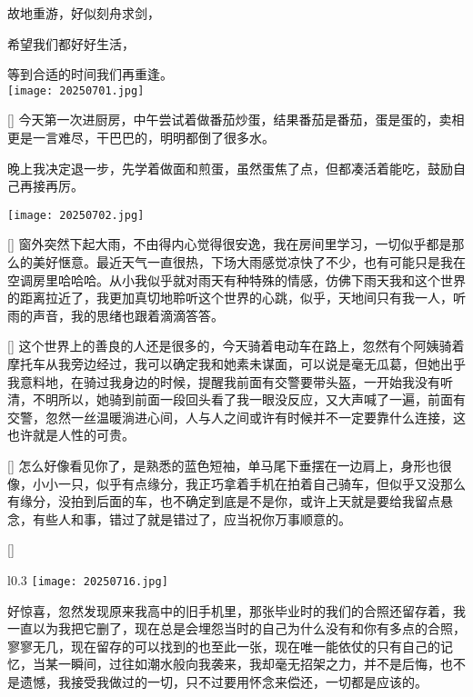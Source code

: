 \documentclass{diary}
\begin{document}
故地重游，好似刻舟求剑，

希望我们都好好生活，

等到合适的时间我们再重逢。\\

\texttt{[image: 20250701.jpg]} 

[\nerdSmile]%
今天第一次进厨房，中午尝试着做番茄炒蛋，结果番茄是番茄，蛋是蛋的，卖相更是一言难尽，干巴巴的，明明都倒了很多水。\par
晚上我决定退一步，先学着做面和煎蛋，虽然蛋焦了点，但都凑活着能吃，鼓励自己再接再厉。\\

\begin{center}
    \texttt{[image: 20250702.jpg]}
\end{center}

[\rainy]%
窗外突然下起大雨，不由得内心觉得很安逸，我在房间里学习，一切似乎都是那么的美好惬意。最近天气一直很热，下场大雨感觉凉快了不少，也有可能只是我在空调房里哈哈哈。从小我似乎就对雨天有种特殊的情感，仿佛下雨天我和这个世界的距离拉近了，我更加真切地聆听这个世界的心跳，似乎，天地间只有我一人，听雨的声音，我的思绪也跟着滴滴答答。

[\simpleSmile]%
这个世界上的善良的人还是很多的，今天骑着电动车在路上，忽然有个阿姨骑着摩托车从我旁边经过，我可以确定我和她素未谋面，可以说是毫无瓜葛，但她出乎我意料地，在骑过我身边的时候，提醒我前面有交警要带头盔，一开始我没有听清，不明所以，她骑到前面一段回头看了我一眼没反应，又大声喊了一遍，前面有交警，忽然一丝温暖淌进心间，人与人之间或许有时候并不一定要靠什么连接，这也许就是人性的可贵。

[\windy]%
怎么好像看见你了，是熟悉的蓝色短袖，单马尾下垂摆在一边肩上，身形也很像，小小一只，似乎有点缘分，我正巧拿着手机在拍着自己骑车，但似乎又没那么有缘分，没拍到后面的车，也不确定到底是不是你，或许上天就是要给我留点悬念，有些人和事，错过了就是错过了，应当祝你万事顺意的。

[\heartEyes]%
\vspace{-1.5em}
\setlength{\columnsep}{2em}
\begin{wrapfigure}{l}{0.3\columnwidth} 
  \vspace{-0.8em}
  \texttt{[image: 20250716.jpg]} 
\end{wrapfigure}
\noindent
\hspace{2em}好惊喜，忽然发现原来我高中的旧手机里，那张毕业时的我们的合照还留存着，我一直以为我把它删了，现在总是会埋怨当时的自己为什么没有和你有多点的合照，寥寥无几，现在留存的可以找到的也至此一张，现在唯一能依仗的只有自己的记忆，当某一瞬间，过往如潮水般向我袭来，我却毫无招架之力，并不是后悔，也不是遗憾，我接受我做过的一切，只不过要用怀念来偿还，一切都是应该的。\\
\end{document}
